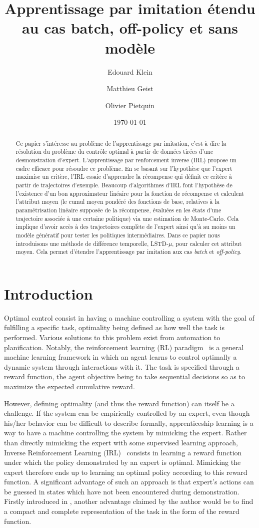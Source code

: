 \documentclass{jfpda2011}
\title{Apprentissage par imitation étendu au cas batch, off-policy et sans modèle}
\author{Edouard Klein\inst{1}\inst{3} \and Matthieu Geist\inst{1} \and Olivier Pietquin\inst{1}\inst{2}}
\institute{
 1. Supélec-Metz Campus, IMS Research group, France, \texttt{nom.prenom@supelec.fr}\\
 2. UMI 2958 CNRS - GeorgiaTech, France\\
 3. Equipe ABC, Loria, INRIA Grand-Est, Nancy, France.
 }
\date{\today}
\begin{document}
\maketitle
\begin{abstract}
 Ce papier s'intéresse au problème de l'apprentissage par imitation, c'est à dire la résolution du problème du contrôle optimal à partir de données tirées d'une desmonstration d'expert. L'apprentissage par renforcement inverse (IRL) propose un cadre efficace pour résoudre ce problème. En se basant sur l'hypothèse que l'expert maximise un critère, l'IRL essaie d'apprendre la récompense qui définit ce critère à partir de trajectoires d'exemple. Beaucoup d'algorithmes d'IRL font l'hypothèse de l'existence d'un bon approximateur linéaire pour la fonction de récompense et calculent l'attribut moyen (le cumul moyen pondéré des fonctions de base, relatives à la paramétrisation linéaire supposée de la récompense, évaluées en les états d'une trajectoire associée à une certaine politique)  via une estimation de Monte-Carlo. Cela implique d'avoir accès à des trajectoires complète de l'expert ainsi qu'à au moins un modèle génératif pour tester les politiques intermédiaires. Dans ce papier nous introduisons une méthode de différence temporelle, LSTD-$\mu$, pour calculer cet attribut moyen. Cela permet d'étendre l'apprentissage par imitation aux cas \emph{batch} et \emph{off-policy}.
\end{abstract}
\section{Introduction}

Optimal control consist in having a machine controlling a system
with the goal of fulfilling a specific task, optimality being
defined as how well the task is performed. Various solutions to this
problem exist from automation to planification. Notably, the
reinforcement learning (RL) paradigm~\citep{sutton1998reinforcement} is a general
machine learning framework in which an agent learns to control
optimally a dynamic system through interactions with it. The task is
specified through a reward function, the agent objective being to
take sequential decisions so as to maximize the expected cumulative
reward.

However, defining optimality (and thus the reward function) can
itself be a challenge. If the system can be empirically controlled
by an expert, even though his/her behavior can be difficult to
describe formally, apprenticeship learning is a way to have a
machine controlling the system by mimicking the expert. Rather than
directly mimicking the expert with some supervised learning
approach, Inverse Reinforcement Learning (IRL)~\citep{ng2000algorithms}
consists in learning a reward function under which the policy
demonstrated by an expert is optimal. Mimicking the expert therefore
ends up to learning an optimal policy according to this reward
function. A significant advantage of such an approach is that
expert's actions can be guessed in states which have not been
encountered during demonstration. Firstly introduced in \citep{russell1998learning}, another advantage claimed by the author would be to
find a compact and complete representation of the task in the form
of the reward function.
\end{document}
